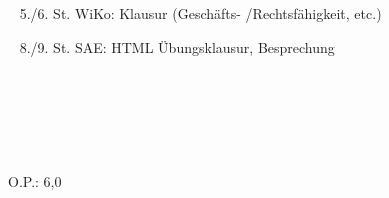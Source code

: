{{	\textbullet~ 5./6. St. WiKo: Klausur (Geschäfts- /Rechtsfähigkeit, etc.)\par
	\textbullet~ 8./9. St. SAE: HTML Übungsklausur, Besprechung\par
	\textbullet~ \par
	\textbullet~ \par
	\textbullet~ 
	}{}{O.P.: 6,0}
}{}
\Unterschrift
\newpage
